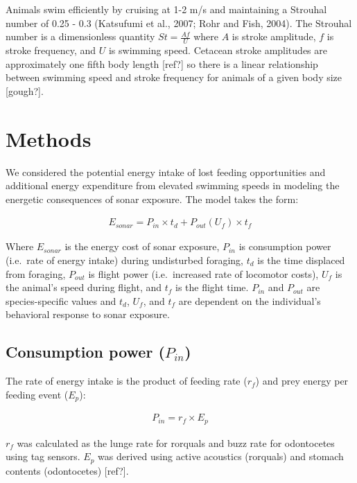 \documentclass[]{elsarticle} %
\begin{document}
Animals swim efficiently by cruising at 1-2 m/s and maintaining a
Strouhal number of 0.25 - 0.3 (Katsufumi et al., 2007; Rohr and Fish,
2004). The Strouhal number is a dimensionless quantity
\(St = \frac{Af}{U}\) where \(A\) is stroke amplitude, \(f\) is stroke
frequency, and \(U\) is swimming speed. Cetacean stroke amplitudes are
approximately one fifth body length {[}ref?{]} so there is a linear
relationship between swimming speed and stroke frequency for animals of
a given body size {[}gough?{]}.

\section{Methods}\label{methods}

We considered the potential energy intake of lost feeding opportunities
and additional energy expenditure from elevated swimming speeds in
modeling the energetic consequences of sonar exposure. The model takes
the form:

\begin{align}
E_{sonar} = P_{in} \times t_d + P_{out}(U_f) \times t_f
\end{align}

Where \(E_{sonar}\) is the energy cost of sonar exposure, \(P_{in}\) is
consumption power (i.e.~rate of energy intake) during undisturbed
foraging, \(t_d\) is the time displaced from foraging, \(P_{out}\) is
flight power (i.e.~increased rate of locomotor costs), \(U_f\) is the
animal's speed during flight, and \(t_f\) is the flight time. \(P_{in}\)
and \(P_{out}\) are species-specific values and \(t_d\), \(U_f\), and
\(t_f\) are dependent on the individual's behavioral response to sonar
exposure.

\subsection{\texorpdfstring{Consumption power
(\(P_{in}\))}{Consumption power (P\_\{in\})}}\label{consumption-power-p_in}

The rate of energy intake is the product of feeding rate (\(r_f\)) and
prey energy per feeding event (\(E_p\)):

\begin{align}
P_{in} = r_f \times E_p
\end{align}

\(r_f\) was calculated as the lunge rate for rorquals and buzz rate for
odontocetes using tag sensors. \(E_p\) was derived using active
acoustics (rorquals) and stomach contents (odontocetes) {[}ref?{]}.
\end{document}
